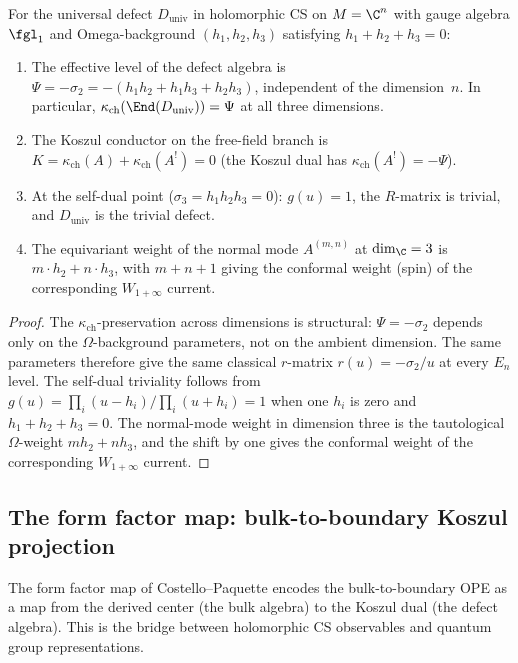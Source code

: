 \begin{proposition}
\label{prop:cp-defect-invariants}
For the universal defect $D_{\mathrm{univ}}$ in holomorphic CS on $M = \C^n$ with gauge algebra $\fgl_1$ and Omega-background $(h_1, h_2, h_3)$ satisfying $h_1 + h_2 + h_3 = 0$:
\begin{enumerate}[label=\textup{(\roman*)}]
 \item The effective level of the defect algebra is $\Psi = -\sigma_2 = -(h_1 h_2 + h_1 h_3 + h_2 h_3)$, independent of the dimension~$n$. In particular, $\kappa_{\mathrm{ch}}(\End(D_{\mathrm{univ}})) = \Psi$ at all three dimensions.
 \item The Koszul conductor on the free-field branch is $K = \kappa_{\mathrm{ch}}(A) + \kappa_{\mathrm{ch}}(A^!) = 0$ (the Koszul dual has $\kappa_{\mathrm{ch}}(A^!) = -\Psi$).
 \item At the self-dual point ($\sigma_3 = h_1 h_2 h_3 = 0$): $g(u) = 1$, the $R$-matrix is trivial, and $D_{\mathrm{univ}}$ is the trivial defect.
 \item The equivariant weight of the normal mode $A^{(m,n)}$ at $\dim_\C = 3$ is $m \cdot h_2 + n \cdot h_3$, with $m + n + 1$ giving the conformal weight (spin) of the corresponding $W_{1+\infty}$ current.
\end{enumerate}
\end{proposition}

\begin{proof}
The $\kappa_{\mathrm{ch}}$-preservation across dimensions is structural:
$\Psi=-\sigma_2$ depends only on the $\Omega$-background parameters, not
on the ambient dimension.  The same parameters therefore give the same
classical $r$-matrix $r(u)=-\sigma_2/u$ at every $E_n$ level.  The
self-dual triviality follows from
$g(u)=\prod_i(u-h_i)/\prod_i(u+h_i)=1$ when one $h_i$ is zero and
$h_1+h_2+h_3=0$.  The normal-mode weight in dimension three is the
tautological $\Omega$-weight $m h_2+n h_3$, and the shift by one gives
the conformal weight of the corresponding $W_{1+\infty}$ current.
\end{proof}

\subsection{The form factor map: bulk-to-boundary Koszul projection}
\label{subsec:cp-form-factor}

The form factor map of Costello--Paquette encodes the bulk-to-boundary OPE as a map from the derived center (the bulk algebra) to the Koszul dual (the defect algebra). This is the bridge between holomorphic CS observables and quantum group representations.

